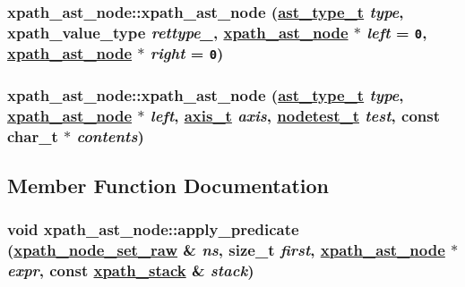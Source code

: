\hypertarget{classxpath__ast__node_f6f4ffea3f3c7fdb6ef1e759d4b070f4}{
\subsubsection[xpath\_\-ast\_\-node]{\setlength{\rightskip}{0pt plus 5cm}xpath\_\-ast\_\-node::xpath\_\-ast\_\-node (\hyperlink{pugixml_8cpp_11258a240266b84b6b0526930e5d330d}{ast\_\-type\_\-t} {\em type}, xpath\_\-value\_\-type {\em rettype\_\-}, \hyperlink{classxpath__ast__node}{xpath\_\-ast\_\-node} $\ast$ {\em left} = {\tt 0}, \hyperlink{classxpath__ast__node}{xpath\_\-ast\_\-node} $\ast$ {\em right} = {\tt 0})}}
\label{classxpath__ast__node_f6f4ffea3f3c7fdb6ef1e759d4b070f4}


\hypertarget{classxpath__ast__node_7cf74b277deba86a6575796c727fe458}{
\subsubsection[xpath\_\-ast\_\-node]{\setlength{\rightskip}{0pt plus 5cm}xpath\_\-ast\_\-node::xpath\_\-ast\_\-node (\hyperlink{pugixml_8cpp_11258a240266b84b6b0526930e5d330d}{ast\_\-type\_\-t} {\em type}, \hyperlink{classxpath__ast__node}{xpath\_\-ast\_\-node} $\ast$ {\em left}, \hyperlink{pugixml_8cpp_e7747145441b0591a5c04f20f6f9189a}{axis\_\-t} {\em axis}, \hyperlink{pugixml_8cpp_b268b4264276130baeb17ab629015275}{nodetest\_\-t} {\em test}, const char\_\-t $\ast$ {\em contents})}}
\label{classxpath__ast__node_7cf74b277deba86a6575796c727fe458}




\subsection{Member Function Documentation}
\hypertarget{classxpath__ast__node_fcefe6b386c214349c5e23f13828fa1e}{
\subsubsection[apply\_\-predicate]{\setlength{\rightskip}{0pt plus 5cm}void xpath\_\-ast\_\-node::apply\_\-predicate (\hyperlink{classxpath__node__set__raw}{xpath\_\-node\_\-set\_\-raw} \& {\em ns}, size\_\-t {\em first}, \hyperlink{classxpath__ast__node}{xpath\_\-ast\_\-node} $\ast$ {\em expr}, const \hyperlink{structxpath__stack}{xpath\_\-stack} \& {\em stack})}}
\label{classxpath__ast__node_fcefe6b386c214349c5e23f13828fa1e}


